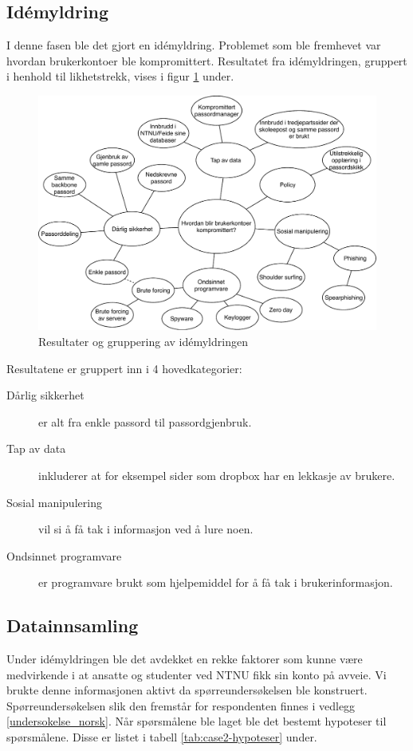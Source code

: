 \subsection{Idémyldring}
I denne fasen ble det gjort en idémyldring. Problemet som ble fremhevet var hvordan brukerkontoer ble kompromittert. Resultatet fra idémyldringen, gruppert i henhold til likhetstrekk, vises i figur \ref{fig:case2-idemyldring} under. 

\begin{figure}[H]
    \centering
    \includegraphics[scale=0.5]{case_2/bilder/idemyldring.pdf}
    \caption[Idémyldring]{Resultater og gruppering av idémyldringen}
    \label{fig:case2-idemyldring}
\end{figure}

Resultatene er gruppert inn i 4 hovedkategorier:
\begin{description}
    \item [Dårlig sikkerhet] er alt fra enkle passord til passordgjenbruk.
    \item [Tap av data] inkluderer at for eksempel sider som dropbox har en lekkasje av brukere.
    \item [Sosial manipulering] vil si å få tak i informasjon ved å lure noen.
    \item [Ondsinnet programvare] er programvare brukt som hjelpemiddel for å få tak i brukerinformasjon.
\end{description}

\subsection{Datainnsamling}
Under idémyldringen ble det avdekket en rekke faktorer som kunne være medvirkende i at ansatte og studenter ved NTNU fikk sin konto på avveie. Vi brukte denne informasjonen aktivt da spørreundersøkelsen ble konstruert. Spørreundersøkelsen slik den fremstår for respondenten finnes i vedlegg \ref{undersokelse_norsk}. Når spørsmålene ble laget ble det bestemt hypoteser til spørsmålene. Disse er listet i tabell \ref{tab:case2-hypoteser} under. 

